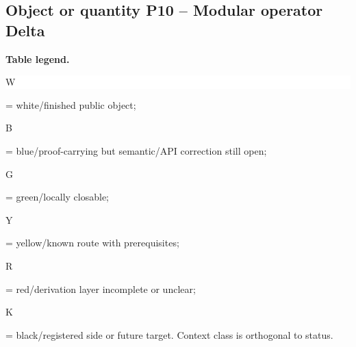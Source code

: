 \subsection*{Object or quantity P10 -- Modular operator Delta}
\hypertarget{objproof:P10}{}
\par\smallskip\noindent\begin{minipage}{0.99\linewidth}\footnotesize\raggedright\textbf{Table legend.} \colorbox{white}{\strut W} = white/finished public object; \colorbox{cyan!20}{\strut B} = blue/proof-carrying but semantic/API correction still open; \colorbox{green!18}{\strut G} = green/locally closable; \colorbox{yellow!25}{\strut Y} = yellow/known route with prerequisites; \colorbox{red!20}{\strut R} = red/derivation layer incomplete or unclear; \colorbox{black!18}{\strut K} = black/registered side or future target. Context class is orthogonal to status.\end{minipage}\par\vspace{0.25em}

